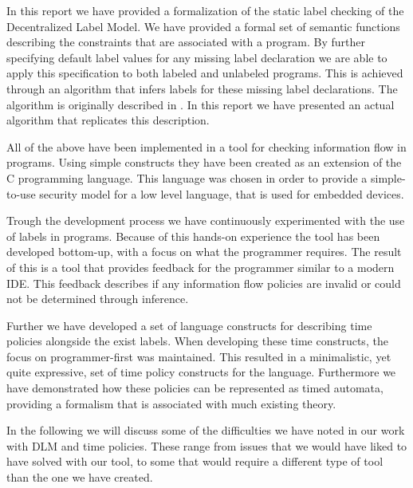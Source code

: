 In this report we have provided a formalization of the static label checking of the Decentralized Label Model.
We have provided a formal set of semantic functions describing the constraints that are associated with a program.
By further specifying default label values for any missing label declaration we are able to apply this specification to both labeled and unlabeled programs.
This is achieved through an algorithm that infers labels for these missing label declarations.
The algorithm is originally described in \cite{myers1997}.
In this report we have presented an actual algorithm that replicates this description.

All of the above have been implemented in a tool for checking information flow in programs.
Using simple constructs they have been created as an extension of the C programming language.
This language was chosen in order to provide a simple-to-use security model for a low level language, that is used for embedded devices.

Trough the development process we have continuously experimented with the use of labels in programs.
Because of this hands-on experience the tool has been developed bottom-up, with a focus on what the programmer requires.
The result of this is a tool that provides feedback for the programmer similar to a modern IDE.
This feedback describes if any information flow policies are invalid or could not be determined through inference.

Further we have developed a set of language constructs for describing time policies alongside the exist labels.
When developing these time constructs, the focus on programmer-first was maintained.
This resulted in a minimalistic, yet quite expressive, set of time policy constructs for the language.
Furthermore we have demonstrated how these policies can be represented as timed automata, providing a formalism that is associated with much existing theory.

In the following we will discuss some of the difficulties we have noted in our work with DLM and time policies.
These range from issues that we would have liked to have solved with our tool, to some that would require a different type of tool than the one we have created.

